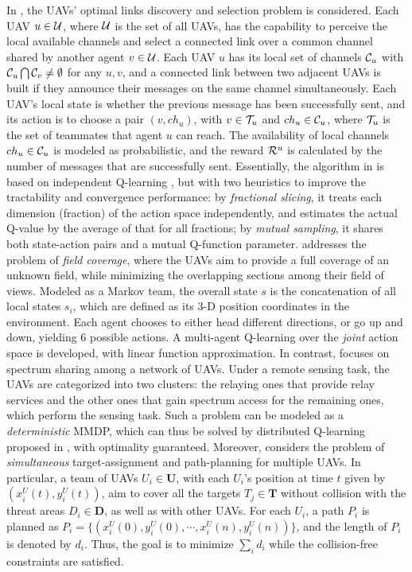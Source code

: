 In \cite{yang2018keeping}, the UAVs' optimal links discovery and selection problem is considered. Each UAV $u\in\mathcal{U}$, where $\mathcal{U}$ is the set of all UAVs, has the  capability to perceive the local available channels and  select a connected link over a common channel shared by another agent $v\in\mathcal{U}$. Each UAV $u$ has its local set of channels $\mathcal{C}_u$ with $\mathcal{C}_u\bigcap \mathcal{C}_v\neq \emptyset$ for any $u,v$, and a connected link between two adjacent UAVs is built if they announce their messages  on the same channel simultaneously.  Each UAV's local state is whether the previous  message has been successfully sent,  and its action is to choose a pair $(v,ch_u)$, with $v\in{\mathcal{T}}_u$ and $ch_u\in \mathcal{C}_u$, where ${\mathcal{T}}_u$ is the set of teammates that agent $u$ can reach. The availability of local channels $ch_u\in \mathcal{C}_u$ is modeled  as probabilistic, and the reward $\mathcal{R}^u$ is calculated by the number of messages that are  successfully sent. Essentially, the algorithm in \cite{yang2018keeping} is based on independent Q-learning \cite{tan1993multi}, but with two heuristics to improve the tractability and convergence performance: by \emph{fractional slicing}, it  treats each dimension (fraction) of the action space independently, and  estimates the actual Q-value by the average of that for all fractions; by \emph{mutual sampling}, it shares both state-action pairs and a mutual Q-function parameter. 
  \cite{pham2018cooperative} addresses the problem of \emph{field coverage}, where the UAVs aim to provide a full coverage of an unknown field, while minimizing the overlapping sections among their field of views.  Modeled as a Markov team, the overall state $s$ is the concatenation of all local states $s_i$, which are defined as its $3$-D position coordinates  in the environment.  Each agent chooses to either head different directions, or go up and down, yielding $6$ possible actions.  A multi-agent Q-learning over the \emph{joint} action space is developed, with linear function approximation.  
In contrast, 
  \cite{shamsoshoara2019distributed} focuses  on spectrum sharing among a network of UAVs. Under a remote sensing task, the UAVs are categorized into two clusters: the relaying ones that provide relay services and  the other ones that gain  spectrum access for the remaining ones, which perform the sensing task. Such a problem can be modeled as a \emph{deterministic} MMDP, which can thus be solved by distributed Q-learning proposed in  \cite{lauer2000algorithm}, with optimality guaranteed.  Moreover, \cite{qie2019joint} considers the problem of \emph{simultaneous} target-assignment and path-planning for multiple UAVs. In particular, a team of UAVs $U_i\in\textbf{U}$, with each $U_i$'s position at time $t$ given by $(x_i^U(t),y_i^U(t))$, aim to cover all the targets $T_j\in\textbf{T}$ without collision with the threat  areas $D_i\in\textbf{D}$, as well as with other UAVs. For each $U_i$, a path  $P_i$ is planned  as $P_i=\{(x_i^U(0),y_i^U(0),\cdots,x_i^U(n),y_i^U(n))\}$, and the length of $P_i$ is denoted by $d_i$. Thus, the goal is to minimize $\sum_{i}d_i$ while the collision-free constraints are satisfied. 
